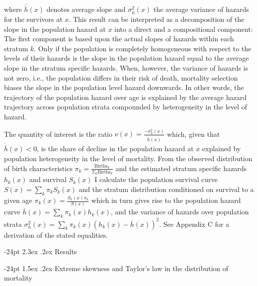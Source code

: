 \documentclass[10pt,twoside,reqno]{article}
\makeatletter
\renewcommand\section{\@startsection {section}{1}{\z@}%
                                   {-24pt}%
                                   {2.3ex \@plus.2ex}%
                                   {\normalfont\large\bfseries}}
\renewcommand\subsection{\@startsection{subsection}{2}{\z@}%
                                     {-24pt}%
                                     {1.5ex \@plus .2ex}%
                                     {\normalfont\normalsize\bfseries}}
\makeatother
\begin{document}
where \(\overline{\dot{h}}(x)\) denotes average slope and \(\sigma^2_h(x)\) the average variance of hazards for the survivors at \(x\). This result can be interpreted as a decomposition of the slope in the population hazard at \(x\) into a direct and a compositional component: The first component is based upon the actual slopes of hazards within each stratum \(k\). Only if the population is completely homogeneous with respect to the levels of their hazards is the slope in the population hazard equal to the average slope in the stratum specific hazards. When, however, the variance of hazards is not zero, i.e., the population differs in their risk of death, mortality selection biases the slope in the population level hazard downwards. In other words, the trajectory of the population hazard over age is explained by the average hazard trajectory across population strata compounded by heterogeneity in the level of hazard.

The quantity of interest is the ratio \(\nu(x)=\frac{-\sigma_h^2(x)}{\dot{\overline{h}}(x)}\) which, given that \(\dot{\overline{h}}(x)<0\), is the share of decline in the population hazard at \(x\) explained by population heterogeneity in the level of mortality. From the observed distribution of birth characteristics \(\pi_k=\frac{\text{Births}_k}{\Sigma_k\text{Births}_k}\) and the estimated stratum specific hazards \(h_k(x)\) and survival \(S_k(x)\) I calculate the population survival curve \(S(x) = \sum_k \pi_k S_k(x)\) and the stratum distribution conditioned on survival to a given age \(\pi_k(x) = \frac{S_k(x)\pi_k}{S(x)}\) which in turn gives rise to the population hazard curve \(\overline{h}(x)= \sum_k \pi_k(x)h_k(x)\), and the variance of hazards over population strata \(\sigma^2_h(x) = \sum_k \pi_k(x) (h_k(x)-\overline{h}(x))^2\). See Appendix C for a derivation of the stated equalities.

\section{Results}\label{results}

\subsection{Extreme skewness and Taylor's law in the distribution of mortality}\label{extreme-skewness-and-taylors-law-in-the-distribution-of-mortality}
\end{document}
